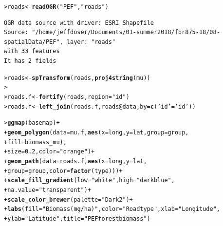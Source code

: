\documentclass[12pt,oneside]{book}\usepackage[]{graphicx}\usepackage[]{color}
\makeatletter
\newcommand{\hlnum}[1]{\textcolor[rgb]{0.686,0.059,0.569}{#1}}%
\newcommand{\hlstr}[1]{\textcolor[rgb]{0.192,0.494,0.8}{#1}}%
\newcommand{\hlopt}[1]{\textcolor[rgb]{0,0,0}{#1}}%
\newcommand{\hlstd}[1]{\textcolor[rgb]{0.345,0.345,0.345}{#1}}%
\newcommand{\hlkwb}[1]{\textcolor[rgb]{0.69,0.353,0.396}{#1}}%
\newcommand{\hlkwc}[1]{\textcolor[rgb]{0.333,0.667,0.333}{#1}}%
\newcommand{\hlkwd}[1]{\textcolor[rgb]{0.737,0.353,0.396}{\textbf{#1}}}%
\newenvironment{kframe}{%
 \def\at@end@of@kframe{}%
 \ifinner\ifhmode%
  \def\at@end@of@kframe{\end{minipage}}%
  \begin{minipage}{\columnwidth}%
 \fi\fi%
 \def\FrameCommand##1{\hskip\@totalleftmargin \hskip-\fboxsep
 \colorbox{shadecolor}{##1}\hskip-\fboxsep
     \hskip-\linewidth \hskip-\@totalleftmargin \hskip\columnwidth}%
 \MakeFramed {\advance\hsize-\width
   \@totalleftmargin\z@ \linewidth\hsize
   \@setminipage}}%
 {\par\unskip\endMakeFramed%
 \at@end@of@kframe}
\newenvironment{knitrout}{}{} %
\makeatother
\begin{document}
\begin{knitrout}
\color{fgcolor}\begin{kframe}
\begin{alltt}
\hlstd{> }\hlstd{roads} \hlkwb{<-} \hlkwd{readOGR}\hlstd{(}\hlstr{"PEF"}\hlstd{,} \hlstr{"roads"}\hlstd{)}
\end{alltt}
\begin{verbatim}
OGR data source with driver: ESRI Shapefile 
Source: "/home/jeffdoser/Documents/01-summer2018/for875-18/08-spatialData/PEF", layer: "roads"
with 33 features
It has 2 fields
\end{verbatim}
\begin{alltt}
\hlstd{> }\hlstd{roads} \hlkwb{<-} \hlkwd{spTransform}\hlstd{(roads,} \hlkwd{proj4string}\hlstd{(mu))}
\hlstd{> }
\hlstd{> }\hlstd{roads.f} \hlkwb{<-} \hlkwd{fortify}\hlstd{(roads,} \hlkwc{region}\hlstd{=}\hlstr{"id"}\hlstd{)}
\hlstd{> }\hlstd{roads.f} \hlkwb{<-} \hlkwd{left_join}\hlstd{(roads.f, roads}\hlopt{@}\hlkwc{data}\hlstd{,} \hlkwc{by} \hlstd{=} \hlkwd{c}\hlstd{(}\hlstr{'id'} \hlstd{=} \hlstr{'id'}\hlstd{))}
\end{alltt}


{\ttfamily\noindent\color{warningcolor}{Warning: Column `id` joining character vector and factor, coercing into character vector}}\begin{alltt}
\hlstd{> }\hlkwd{ggmap}\hlstd{(basemap)} \hlopt{+}
\hlstd{+ }    \hlkwd{geom_polygon}\hlstd{(}\hlkwc{data}\hlstd{=mu.f,} \hlkwd{aes}\hlstd{(}\hlkwc{x} \hlstd{= long,} \hlkwc{y} \hlstd{= lat,} \hlkwc{group}\hlstd{=group,}
\hlstd{+ }                                \hlkwc{fill}\hlstd{=biomass_mu),}
\hlstd{+ }                 \hlkwc{size}\hlstd{=}\hlnum{0.2}\hlstd{,} \hlkwc{color}\hlstd{=}\hlstr{"orange"}\hlstd{)} \hlopt{+}
\hlstd{+ }    \hlkwd{geom_path}\hlstd{(}\hlkwc{data}\hlstd{=roads.f,} \hlkwd{aes}\hlstd{(}\hlkwc{x} \hlstd{= long,} \hlkwc{y} \hlstd{= lat,}
\hlstd{+ }                                \hlkwc{group}\hlstd{=group,} \hlkwc{color}\hlstd{=}\hlkwd{factor}\hlstd{(type)))} \hlopt{+}
\hlstd{+ }    \hlkwd{scale_fill_gradient}\hlstd{(}\hlkwc{low}\hlstd{=}\hlstr{"white"}\hlstd{,} \hlkwc{high}\hlstd{=}\hlstr{"darkblue"}\hlstd{,}
\hlstd{+ }                        \hlkwc{na.value}\hlstd{=}\hlstr{"transparent"}\hlstd{)} \hlopt{+}
\hlstd{+ }    \hlkwd{scale_color_brewer}\hlstd{(}\hlkwc{palette}\hlstd{=}\hlstr{"Dark2"}\hlstd{)} \hlopt{+}
\hlstd{+ }    \hlkwd{labs}\hlstd{(}\hlkwc{fill}\hlstd{=}\hlstr{"Biomass (mg/ha)"}\hlstd{,} \hlkwc{color}\hlstd{=}\hlstr{"Road type"}\hlstd{,} \hlkwc{xlab}\hlstd{=}\hlstr{"Longitude"}\hlstd{,}
\hlstd{+ }         \hlkwc{ylab}\hlstd{=}\hlstr{"Latitude"}\hlstd{,} \hlkwc{title}\hlstd{=}\hlstr{"PEF forest biomass"}\hlstd{)}
\end{alltt}



\end{kframe}
\end{knitrout}
\end{document}
